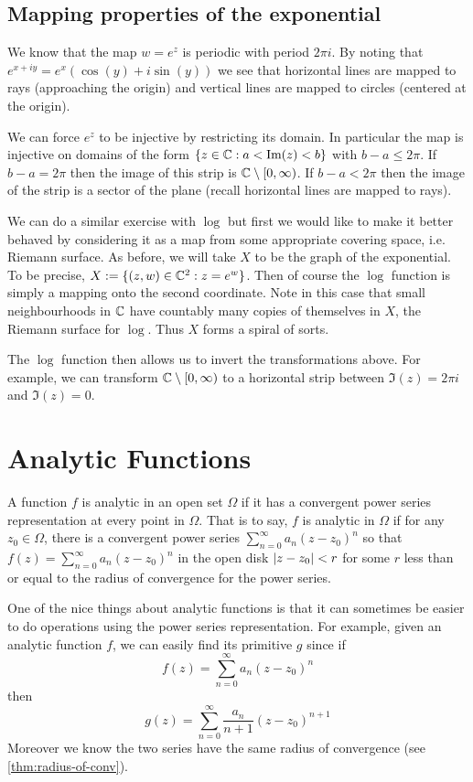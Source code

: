 \subsection{Mapping properties of the exponential}
We know that the map $w = e^z$ is periodic with period $2\pi i$. By noting that $e^{x + iy} = e^x(\cos(y) + i \sin(y))$ we see that horizontal lines are mapped to rays (approaching the origin) and vertical lines are mapped to circles (centered at the origin). 

We can force $e^z$ to be injective by restricting its domain. In particular the map is injective on domains of the form $\{z \in \mathbb{C} : a <  \text{Im}(z) < b\}$ with $b - a \leq 2\pi$. If $b - a = 2\pi$ then the image of this strip is $\mathbb{C} \setminus [0, \infty)$. If $b - a < 2\pi$ then the image of the strip is a sector of the plane (recall horizontal lines are mapped to rays). 

We can do a similar exercise with $\log$ but first we would like to make it better behaved by considering it as a map from some appropriate covering space, i.e. Riemann surface. As before, we will take $X$ to be the graph of the exponential. To be precise, $X := \{(z, w) \in \mathbb{C}^2 : z = e^w\}$. Then of course the $\log$ function is simply a mapping onto the second coordinate. Note in this case that small neighbourhoods in $\mathbb{C}$ have countably many copies of themselves in $X$, the Riemann surface for $\log$. Thus $X$ forms a spiral of sorts.

The $\log$ function then allows us to invert the transformations above. For example, we can transform $\mathbb{C} \setminus [0, \infty)$ to a horizontal strip between $\Im(z) = 2\pi i$ and $\Im(z) = 0$. 

\section{Analytic Functions}
\begin{definition}
A function $f$ is analytic in an open set $\Omega$ if it has a convergent power series representation at every point in $\Omega$. That is to say, $f$ is analytic in $\Omega$ if for any $z_0 \in \Omega$, there is a convergent power series $\sum_{n = 0}^\infty a_n (z - z_0)^n$ so that $f(z) = \sum_{n = 0}^\infty a_n (z - z_0)^n$ in the open disk $\left|z - z_0\right| < r$ for some $r$ less than or equal to the radius of convergence for the power series.
\end{definition}

One of the nice things about analytic functions is that it can sometimes be easier to do operations using the power series representation. For example, given an analytic function $f$, we can easily find its primitive $g$ since if 
$$ f(z) = \sum_{n = 0}^\infty a_n (z - z_0)^n $$
then
$$ g(z) = \sum_{n =0}^\infty \frac{a_n}{n + 1}(z - z_0)^{n+1} $$
Moreover we know the two series have the same radius of convergence (see \autoref{thm:radius-of-conv}). 


